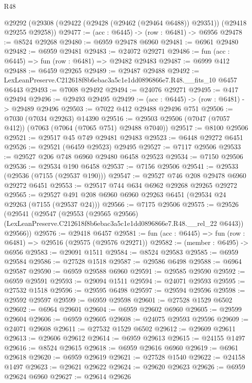 \begin{lexlean}{R48}
\begin{coremodule}
  @29292 (@29308 (@29422 (@29428 (@29462 (@29464 @6488)) @29351)) (@29418 @29255 @29258))
@29477 := (acc : @6445) -> (row : @6481) -> @6956
@29478 := @8524 @29268
@29480 := @6959 @29478 @6960
@29481 := @6961 @29480
@29482 := @6959 @29481
@29483 := @24072 @29271
@29486 := fun (acc : @6445) => fun (row : @6481) => @29482 @29483
@29487 := @6999 @412
@29488 := @6459 @29265
@29489 := @29487 @29488
@29492 := LexLeanPreserve.C212618f8b6ebac3a5c1e1dd0896866e7.R48.__fits_10 @6457 @6443
@29493 := @7008 @29492
@29494 := @24076 @29271
@29495 := @417 @29494
@29496 := @29493 @29495
@29499 := (acc : @6445) -> (row : @6481) -> @29489 @29496
@29503 := @7022 @412 @29488 @29496 @751
@29506 := @7030 (@7034 @29263) @14390
@29516 := @29503 @29506 (@7047 (@7057 @412)) (@7063 (@7064 (@7065 @751) @29488 @7040))
@29517 := @8100 @29506
@29521 := @29517 @45 @749 @29481 @29483
@29523 := @6448 @29272 @6451
@29526 := @29521 (@6459 @29523) @29495
@29527 := @7117 @29506
@29533 := @29527 @206 @748 @6960 @29480 @6458 @29523
@29534 := @7150 @29506
@29536 := @29534 @190 @6458
@29537 := @7156 @29506
@29541 := @29533 (@29536 (@7155 (@29537 @190)))
@29547 := @29527 @746 @208 @29478 @6960 @29272 @6451
@29553 := @29517 @744 @634 @6962 @29268 @29265 @29272
@29565 := @29527 @491 @208 @6960 @6960 @29263 @6451 (@29534 @24 @29263 (@7155 (@29537 @24)))
@29566 := @7175 @29506
@29575 := @29526
    (@29541
      (@29547
        (@29553
          (@29565 @29566)
          (LexLeanPreserve.C212618f8b6ebac3a5c1e1dd0896866e7.R48.__rel_22 @6443))
        @29566))
@29576 := @29418 @6457
@29581 := fun (acc : @6445) => fun (row : @6481) => @29516 (@29575 (@29576 @29271))
@29582 := (member : @6495) -> @6956
@29583 := @29091 @1511
@29584 := @8524 @29583
@29585 := @6959 @29584
@29586 := @27528 @1518
@29587 := @29586 @6498
@29588 := @6964 @29587
@29590 := @6959 @29588 @6960
@29591 := @29585 @29590
@29592 := @6959 @29591
@29593 := @29094 @1511
@29594 := @24071 @29593
@29595 := @27532 @1518
@29596 := @29595 @6498
@29597 := @29594 @29596
@29598 := @29592 @29597
@29599 := @6959 @29598
@29601 := @27528 @1529 @6502
@29602 := @6964 @29601
@29604 := @6959 @29602 @6960
@29605 := @29599 @29604
@29606 := @6959 @29605
@29608 := @24075 @29593 @29596
@29609 := @24071 @29608
@29611 := @27532 @1529 @6502
@29612 := @29609 @29611
@29613 := @29606 @29612
@29614 := @6959 @29613
@29615 := @24155 @1497
@29616 := @8524 @29615
@29618 := @6959 @29616 @6960
@29619 := @6961 @29618
@29620 := @6959 @29619
@29621 := @27528 @1540
@29622 := @24158 @1497
@29623 := @29621 @29622
@29624 := @29620 @29623
@29626 := @6959 @29624 @6960
@29627 := @29614 @29626

\end{coremodule}
\end{lexlean}
